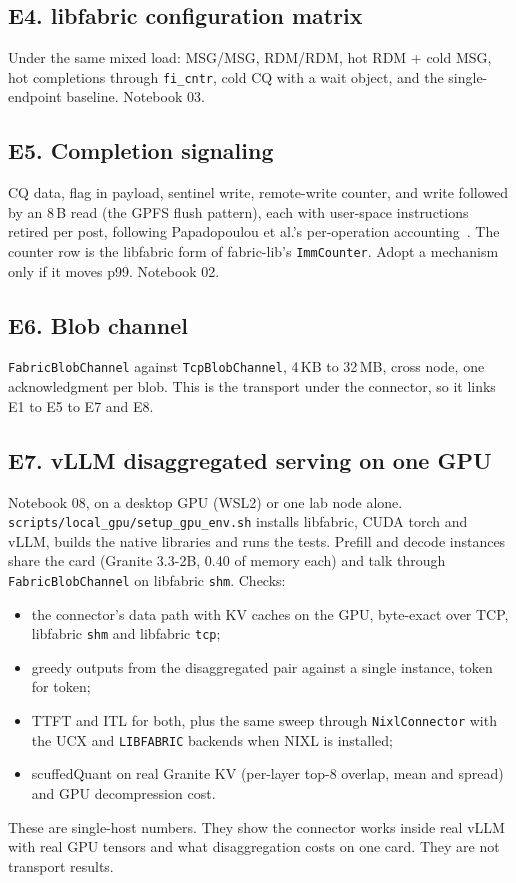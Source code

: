 \documentclass[11pt,letterpaper]{article}
\begin{document}
\subsection{E4. libfabric configuration matrix}
Under the same mixed load: MSG/MSG, RDM/RDM, hot RDM + cold MSG, hot completions through \texttt{fi\_cntr}, cold CQ with a wait object, and the single-endpoint baseline. Notebook 03.

\subsection{E5. Completion signaling}
CQ data, flag in payload, sentinel write, remote-write counter, and write followed by an 8\,B read (the GPFS flush pattern), each with user-space instructions retired per post, following Papadopoulou et al.'s per-operation accounting~\cite{papadopoulou2017}. The counter row is the libfabric form of fabric-lib's \texttt{ImmCounter}. Adopt a mechanism only if it moves p99. Notebook 02.

\subsection{E6. Blob channel}
\texttt{FabricBlobChannel} against \texttt{TcpBlobChannel}, 4\,KB to 32\,MB, cross node, one acknowledgment per blob. This is the transport under the connector, so it links E1 to E5 to E7 and E8.

\subsection{E7. vLLM disaggregated serving on one GPU}
Notebook 08, on a desktop GPU (WSL2) or one lab node alone. \nolinkurl{scripts/local_gpu/setup_gpu_env.sh} installs libfabric, CUDA torch and vLLM, builds the native libraries and runs the tests. Prefill and decode instances share the card (Granite 3.3-2B, 0.40 of memory each) and talk through \texttt{FabricBlobChannel} on libfabric \texttt{shm}. Checks:
\begin{itemize}
\item the connector's data path with KV caches on the GPU, byte-exact over TCP, libfabric \texttt{shm} and libfabric \texttt{tcp};
\item greedy outputs from the disaggregated pair against a single instance, token for token;
\item TTFT and ITL for both, plus the same sweep through \texttt{NixlConnector} with the UCX and \texttt{LIBFABRIC} backends when NIXL is installed;
\item scuffedQuant on real Granite KV (per-layer top-8 overlap, mean and spread) and GPU decompression cost.
\end{itemize}
These are single-host numbers. They show the connector works inside real vLLM with real GPU tensors and what disaggregation costs on one card. They are not transport results.
\end{document}
